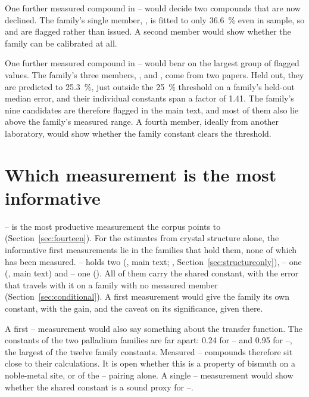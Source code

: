 \documentclass[preprint, 12pt]{elsarticle}
\begin{document}
One further measured compound in -- would decide two compounds that are now declined.
The family's single member, , is fitted to only \SI{36.6}{\percent} even in sample, so
 and  are flagged rather than issued. A second member would show whether the
family can be calibrated at all.

One further measured compound in -- would bear on the largest group of flagged
values. The family's three members, ,  and , come from two papers.
Held out, they are predicted to \SI{25.3}{\percent}, just outside the \SI{25}{\percent} threshold
on a family's held-out median error, and their individual constants span a factor of \num{1.41}.
The family's nine candidates are therefore flagged in the main text, and most of them also lie
above the family's measured range. A fourth member, ideally from another laboratory, would show
whether the family constant clears the threshold.

\section{Which measurement is the most informative}
\label{sec:informative}

-- is the most productive measurement the corpus points to
(Section~\ref{sec:fourteen}). For the estimates from crystal structure alone, the informative first
measurements lie in the families that hold them, none of which has been measured. --
holds two (, main text; , Section~\ref{sec:structureonly}), --
one (, main text) and -- one (). All of them carry the shared
constant, with the error that travels with it on a family with no measured member
(Section~\ref{sec:conditional}). A first measurement would give the family its own constant, with
the gain, and the caveat on its significance, given there.

A first -- measurement would also say something about the transfer function. The
constants of the two palladium families are far apart: \num{0.24} for -- and
\num{0.95} for --, the largest of the twelve family constants. Measured
-- compounds therefore sit close to their calculations. It is open whether this is a
property of bismuth on a noble-metal site, or of the -- pairing alone. A single
-- measurement would show whether the shared constant is a sound proxy for
--.
\end{document}

